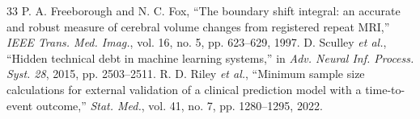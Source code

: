 \documentclass[journal]{IEEEtran}
\begin{document}
\begin{thebibliography}{33}
 P. A. Freeborough and N. C. Fox, ``The boundary shift integral: an accurate and robust measure of cerebral volume changes from registered repeat MRI,'' \emph{IEEE Trans. Med. Imag.}, vol. 16, no. 5, pp. 623--629, 1997.
 D. Sculley \emph{et al.}, ``Hidden technical debt in machine learning systems,'' in \emph{Adv. Neural Inf. Process. Syst. 28}, 2015, pp. 2503--2511.
 R. D. Riley \emph{et al.}, ``Minimum sample size calculations for external validation of a clinical prediction model with a time-to-event outcome,'' \emph{Stat. Med.}, vol. 41, no. 7, pp. 1280--1295, 2022.
\end{thebibliography}
\end{document}

